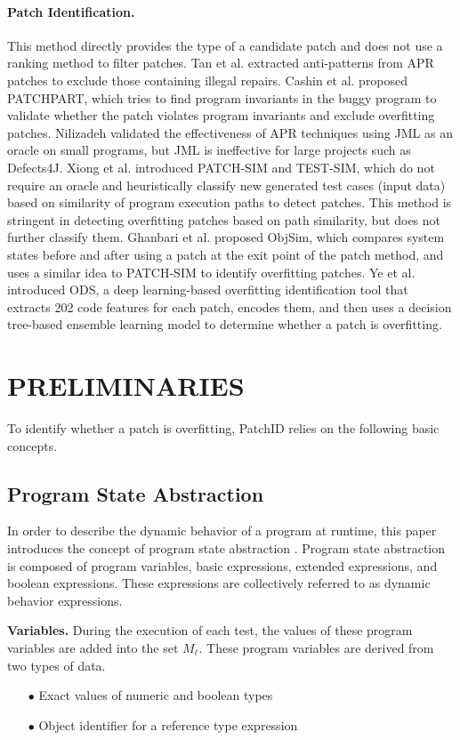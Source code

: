 \paragraph{Patch Identification.}  This method directly provides the type of a candidate patch and does not use a ranking method to filter patches. Tan et al. \cite{ref52} extracted anti-patterns from APR patches to exclude those containing illegal repairs. Cashin et al. \cite{ref53} proposed PATCHPART, which tries to find program invariants in the buggy program to validate whether the patch violates program invariants and exclude overfitting patches. Nilizadeh \cite{ref54} validated the effectiveness of APR techniques using JML as an oracle on small programs, but JML is ineffective for large projects such as Defects4J. Xiong et al.\cite{ref6} introduced PATCH-SIM and TEST-SIM, which do not require an oracle and heuristically classify new generated test cases (input data) based on similarity of program execution paths to detect patches. This method is stringent in detecting overfitting patches based on path similarity, but does not further classify them. Ghanbari et al. \cite{ref55} proposed ObjSim, which compares system states before and after using a patch at the exit point of the patch method, and uses a similar idea to PATCH-SIM to identify overfitting patches. Ye et al. \cite{ref56} introduced ODS, a deep learning-based overfitting identification tool that extracts 202 code features for each patch, encodes them, and then uses a decision tree-based ensemble learning model to determine whether a patch is overfitting.

\section{PRELIMINARIES}\label{3}
To identify whether a patch is overfitting, PatchID relies on the following basic concepts.
\subsection{Program State Abstraction}\label{3.1}
In order to describe the dynamic behavior of a program at runtime, this paper introduces the concept of program state abstraction \cite{ref57}. Program state abstraction is composed of program variables, basic expressions, extended expressions, and boolean expressions. These expressions are collectively referred to as dynamic behavior expressions.

\textbf{Variables.} During the execution of each test, the values of these program variables are added into the set $ M_{\ell}$. These program variables are derived from two types of data.
\begin{itemize}
	\item[$\bullet$] Exact values of numeric and boolean types
	\item[$\bullet$] Object identifier for a reference type expression
\end{itemize}

